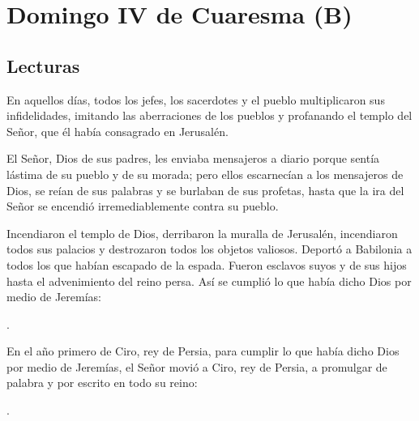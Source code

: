 \chapter{Domingo IV de Cuaresma (B)}

\section{Lecturas}


 


\begin{scripture}
En aquellos días, todos los jefes, los sacerdotes y el pueblo multiplicaron sus infidelidades, imitando las aberraciones de los pueblos y profanando el templo del Señor, que él había consagrado en Jerusalén.

El Señor, Dios de sus padres, les enviaba mensajeros a diario porque sentía lástima de su pueblo y de su morada; pero ellos escarnecían a los mensajeros de Dios, se reían de sus palabras y se burlaban de sus profetas, hasta que la ira del Señor se encendió irremediablemente contra su pueblo.

Incendiaron el templo de Dios, derribaron la muralla de Jerusalén, incendiaron todos sus palacios y destrozaron todos los objetos valiosos. Deportó a Babilonia a todos los que habían escapado de la espada. Fueron esclavos suyos y de sus hijos hasta el advenimiento del reino persa. Así se cumplió lo que había dicho Dios por medio de Jeremías:

.

En el año primero de Ciro, rey de Persia, para cumplir lo que había dicho Dios por medio de Jeremías, el Señor movió a Ciro, rey de Persia, a promulgar de palabra y por escrito en todo su reino:

.
\end{scripture}


